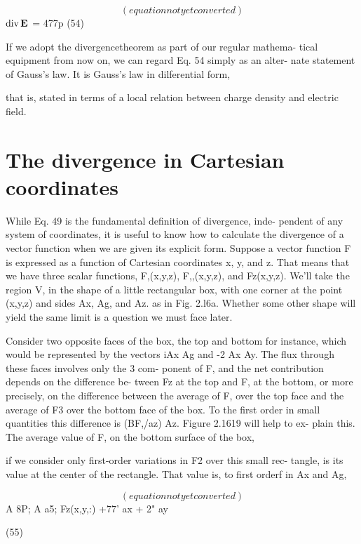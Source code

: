 \begin{equation}
(equation not yet converted)
\end{equation}
$\operatorname{div}\mathbf{E}$ = 477p (54)

If we adopt the divergencetheorem as part of our regular mathema-
tical equipment from now on, we can regard Eq. 54 simply as an alter-
nate statement of Gauss's law. It is Gauss's law in dilferential form,

that is, stated in terms of a local relation between charge density and
electric field.

\section{The divergence in Cartesian coordinates}

While Eq. 49 is the fundamental definition of divergence, inde-
pendent of any system of coordinates, it is useful to know how to
calculate the divergence of a vector function when we are given its
explicit form. Suppose a vector function F is expressed as a function
of Cartesian coordinates x, y, and z. That means that we have three
scalar functions, F,(x,y,z), F,,(x,y,z), and Fz(x,y,z). We'll take the
region V, in the shape of a little rectangular box, with one corner at
the point (x,y,z) and sides Ax, Ag, and Az. as in Fig. 2.l6a. Whether
some other shape will yield the same limit is a question we must face
later.

Consider two opposite faces of the box, the top and bottom for
instance, which would be represented by the vectors iAx Ag and
-2 Ax Ay. The flux through these faces involves only the 3 com-
ponent of F, and the net contribution depends on the difference be-
tween Fz at the top and F, at the bottom, or more precisely, on the
difference between the average of F, over the top face and the average
of F3 over the bottom face of the box. To the first order in small
quantities this difference is (BF,/az) Az. Figure 2.1619 will help to ex-
plain this. The average value of F, on the bottom surface of the box,

if we consider only first-order variations in F2 over this small rec-
tangle, is its value at the center of the rectangle. That value is, to
first orderf in Ax and Ag,

\begin{equation}
(equation not yet converted)
\end{equation}
A 8P; A a5;
Fz(x,y,:) +77' ax + 2" ay

(55)

